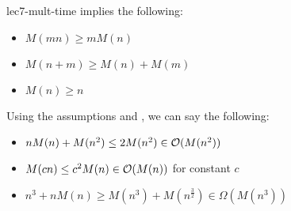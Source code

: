 \begin{proposition}{}{lec7-mult-time}
     implies the following:
    \begin{itemize}
        \item $M(mn) \geq mM(n)$
        \item $M(n + m) \geq M(n) + M(m)$
        \item $M(n) \geq n$
    \end{itemize}
\end{proposition}

\begin{example}{}{}
    Using the assumptions and , we can say the following:
    \begin{itemize}
        \item $nM(n) + M(n^2) \leq 2M(n^2) \in \operatorname{\mathcal{O}}(M(n^2))$
        \item $M(cn) \leq c^2M(n) \in \operatorname{\mathcal{O}}(M(n))$ for constant $c$ 
        \item $n^3 + nM(n) \geq M(n^3) + M(n^{\frac{3}{2}}) \in \Omega(M(n^3))$
    \end{itemize}
\end{example}
